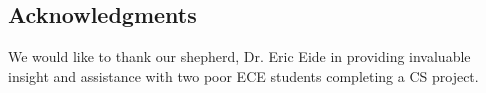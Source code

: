 \documentclass[letterpaper,twocolumn,10pt]{article}
\begin{document}




\subsection*{Acknowledgments}
We would like to thank our shepherd, Dr. Eric Eide in providing invaluable insight and assistance with two poor ECE students completing a CS project.

{\footnotesize 
}
\end{document}
